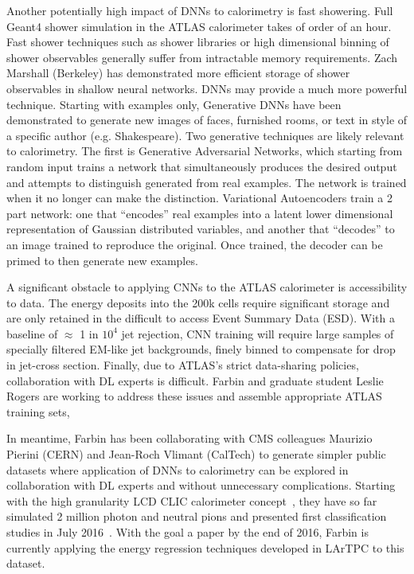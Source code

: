 Another potentially high impact of DNNs to calorimetry is fast
showering. Full Geant4 shower simulation in the ATLAS calorimeter
takes of order of an hour. Fast shower techniques such as shower
libraries or high dimensional binning of shower observables generally
suffer from intractable memory requirements. Zach Marshall (Berkeley)
has demonstrated more efficient storage of shower observables in
shallow neural networks. DNNs may provide a much more powerful
technique.  Starting with examples only, Generative DNNs have been
demonstrated to generate new images of faces, furnished rooms, or text
in style of a specific author (e.g. Shakespeare). Two generative
techniques are likely relevant to calorimetry. The first is Generative
Adversarial Networks, which starting from random input trains a
network that simultaneously produces the desired output and attempts
to distinguish generated from real examples. The network is trained
when it no longer can make the distinction. Variational Autoencoders
train a 2 part network: one that ``encodes'' real examples into a
latent lower dimensional representation of Gaussian distributed
variables, and another that ``decodes'' to an image trained to
reproduce the original. Once trained, the decoder can be primed to
then generate new examples.

A significant obstacle to applying CNNs to the ATLAS calorimeter is
accessibility to data. The energy deposits into the 200k cells require
significant storage and are only retained in the difficult to access
Event Summary Data (ESD). With a baseline of $\approx$ 1 in $10^4$ jet
rejection, CNN training will require large samples of specially
filtered EM-like jet backgrounds, finely binned to compensate for
drop in jet-cross section. Finally, due to ATLAS's strict data-sharing
policies, collaboration with DL experts is difficult. Farbin and
graduate student Leslie Rogers are working to address these issues and
assemble appropriate ATLAS training sets,

In meantime, Farbin has been collaborating with CMS colleagues
Maurizio Pierini (CERN) and Jean-Roch Vlimant (CalTech) to generate
simpler public datasets where application of DNNs to calorimetry can
be explored in collaboration with DL experts and without unnecessary
complications. Starting with the high granularity LCD CLIC calorimeter
concept~\cite{2012arXiv1202.5940L}, they have so far simulated 2 million photon and neutral
pions and presented first classification studies in July
2016~\cite{LCDSimonsDL}. With the goal a paper by the end of 2016, Farbin is
currently applying the energy regression techniques developed in
LArTPC to this dataset.


